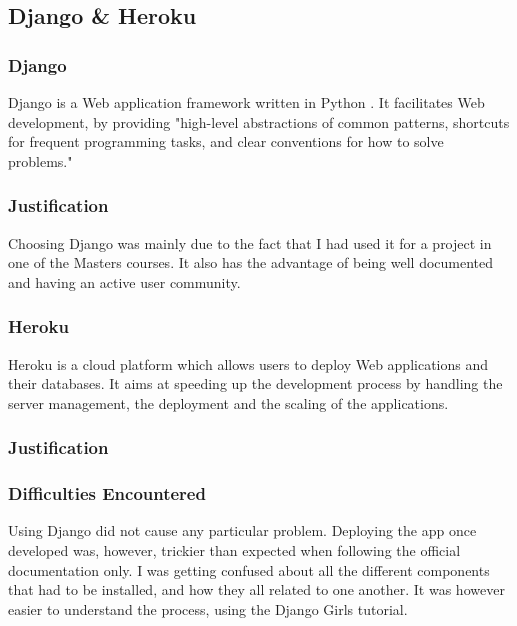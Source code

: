 \documentclass{mproj}
\begin{document}
\subsection{Django \& Heroku}

\subsubsection*{Django}

Django is a Web application framework written in Python \cite{django}. It facilitates Web development, by providing "high-level abstractions of common patterns, shortcuts for frequent programming tasks, and clear conventions for how to solve problems." \cite{djangobook}

\subsubsection*{Justification}

Choosing Django was mainly due to the fact that I had used it for a project in one of the Masters courses. It also has the advantage of being well documented and having an active user community.\par

\subsubsection*{Heroku}

Heroku is a cloud platform which allows users to deploy Web applications and their databases. It aims at speeding up the development process by handling the server management, the deployment and the scaling of the applications. \cite{heroku}

\subsubsection*{Justification}



\subsubsection*{Difficulties Encountered}

Using Django did not cause any particular problem. Deploying the app once developed was, however, trickier than expected when following the official documentation only. I was getting confused about all the different components that had to be installed, and how they all related to one another. It was however easier to understand the process, using the Django Girls tutorial. \cite{djangogirls}
\end{document}
